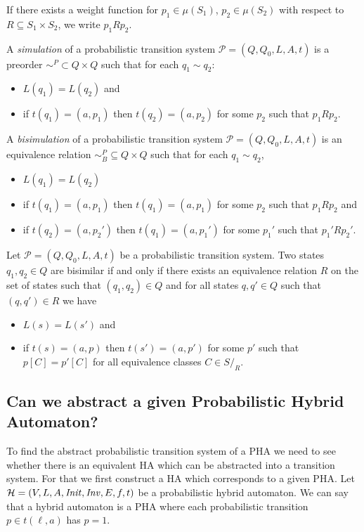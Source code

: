 If there exists a weight function for $p_{1}\in\mu(S_{1})$, $p_{2}\in\mu(S_{2})$ with respect to $R\subseteq S_{1}\times S_{2}$, we write $p_{1} R p_{2}$.

\begin{defi}
A \emph{simulation} of a probabilistic transition system $\mathcal{P} =(Q,Q_{0},L,A,t)$ is a preorder $\sim^{P}\subset Q\times Q$ such that for each $q_{1}\sim q_{2}$:
\begin{itemize}
    \item $L(q_{1}) = L(q_{2})$ and
    \item if $t(q_{1})=(a,p_{1})$ then $t(q_{2})=(a,p_{2})$ for some $p_{2}$ such that $p_{1} R p_{2}$.
\end{itemize}
\end{defi}


\begin{defi}
A \emph{bisimulation} of a probabilistic transition system $\mathcal{P}=(Q,Q_{0},L,A,t)$ is an equivalence relation $\sim_{B}^{P}\subseteq Q\times Q$ such that for each $q_{1}\sim q_{2}$,
\begin{itemize}
    \item $L(q_{1})=L(q_{2})$
    \item if $t(q_{1})=(a,p_{1})$ then $t(q_{1})=(a,p_{1})$ for some $p_{2}$ such that $p_{1} R p_{2}$ and
    \item if $t(q_{2})=(a,p_{2}')$ then $t(q_{1})=(a,p_{1}')$ for some $p_{1}'$ such that $p_{1}' R p_{2}'$.
\end{itemize}
\end{defi}

\begin{prop}
Let $\mathcal{P} =(Q,Q_{0},L,A,t)$ be a probabilistic transition system. Two states $q_{1},q_{2}\in Q$ are bisimilar if and only if there exists an equivalence relation $R$ on the set of states such that $(q_{1},q_{2})\in Q$ and for all states $q,q'\in Q$ such that $(q,q')\in R$ we have
\begin{itemize}
    \item $L(s)=L(s')$ and
    \item if $t(s)=(a,p)$ then $t(s')=(a,p')$ for some $p'$ such that $p[C] = p'[C]$ for all equivalence classes $C\in S/_{R}$.
\end{itemize}
\end{prop}


\subsection{Can we abstract a given Probabilistic Hybrid Automaton?}
To find the abstract probabilistic transition system of a PHA we need to see whether there is an equivalent HA which can be abstracted into a transition system. For that we first construct a HA which corresponds to a given PHA. Let $\mathcal{H}=(V,L,A,\mathit{Init},\mathit{Inv},E,f,t)$ be a probabilistic hybrid automaton. We can say that a hybrid automaton is a PHA where each probabilistic transition $p\in t(\ell,a)$ has $p=1$.

